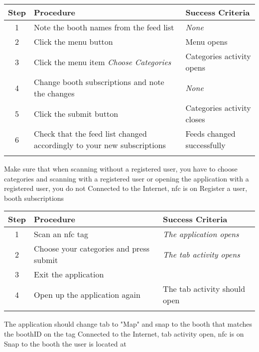 \begin{center}
\begin{tabular}{| c | p{4.6cm} | p{4.6cm} |}
\hline
\textbf{Step} & \textbf{Procedure} & \textbf{Success Criteria}\\
\hline
1 & Note the booth names from the feed list & \textit{None}\\
\hline
2 & Click the menu button & Menu opens\\
\hline
3 & Click the menu item \textit{Choose Categories} & Categories activity opens\\
\hline
4 & Change booth subscriptions and note the changes & \textit{None}\\
\hline
5 & Click the submit button & Categories activity closes\\
\hline
6 & Check that the feed list changed accordingly to your new subscriptions & Feeds changed successfully\\
\hline
\multicolumn{3}{c}{} \\%
\end{tabular}
\end{center}

\testcase
{\casesix}
{Make sure that when scanning without a registered user, you have to choose categories and scanning with a registered user or opening the application with a registered user, you do not}
{Connected to the Internet, \ac{nfc} is on}
{Register a user, booth subscriptions}

\begin{center}
\begin{tabular}{| c | p{4.6cm} | p{4.6cm} |}
\hline
\textbf{Step} & \textbf{Procedure} & \textbf{Success Criteria}\\
\hline
1 & Scan an \ac{nfc} tag & \textit{The application opens}\\
\hline
2 & Choose your categories and press submit & \textit{The tab activity opens}\\
\hline
3 & Exit the application & \\
4 & Open up the application again & The tab activity should open\\
\hline
\multicolumn{3}{c}{} \\%
\end{tabular}
\end{center}

\testcase
{\caseseven}
{The application should change tab to "Map" and snap to the booth that matches the boothID on the tag}
{Connected to the Internet,  tab activity open, \ac{nfc} is on}
{Snap to the booth the user is located at}

